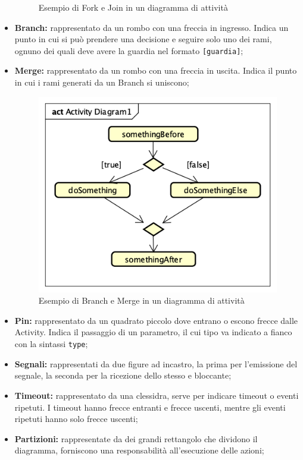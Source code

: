 \begin{itemize}
\begin{figure}[h]
		\caption{Esempio di Fork e Join in un diagramma di attività}\label{}
	\end{figure}
	\item \textbf{Branch:} rappresentato da un rombo con una freccia in ingresso. Indica un punto in cui si può prendere una decisione e seguire solo uno dei rami, ognuno dei quali deve avere la guardia nel formato \texttt{[guardia]};
	\item \textbf{Merge:} rappresentato da un rombo con una freccia in uscita. Indica il punto in cui i rami generati da un Branch si uniscono;
	\begin{figure}[h]
		\centering
		\includegraphics[scale=0.5]{images/BranchMerge.png}
		\caption{Esempio di Branch e Merge in un diagramma di attività}\label{}
	\end{figure}
	\item \textbf{Pin:} rappresentato da un quadrato piccolo dove entrano o escono frecce dalle Activity. Indica il passaggio di un parametro, il cui tipo va indicato a fianco con la sintassi \texttt{type};
	\item \textbf{Segnali:} rappresentati da due figure ad incastro, la prima per l'emissione del segnale, la seconda per la ricezione dello stesso e bloccante;
	\item  \textbf{Timeout:} rappresentato da una clessidra, serve per indicare timeout o eventi ripetuti. I timeout hanno frecce entranti e frecce uscenti, mentre gli eventi ripetuti hanno solo frecce uscenti;
	\item \textbf{Partizioni:} rappresentate da dei grandi rettangolo che dividono il diagramma, forniscono una responsabilità all'esecuzione delle azioni;

\end{itemize}
